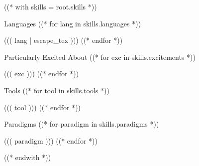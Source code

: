 ((* with skills = root.skills *))
\relax
    \vspace{-2em} %
    \begin{multicols}{2}
        \begin{csitemize}{Languages}
        ((* for lang in skills.languages *))
            \item ((( lang | escape_tex )))
        ((* endfor *))
        \end{csitemize}

        \begin{csitemize}{Particularly Excited About}
        ((* for exc in skills.excitements *))
            \item ((( exc )))
        ((* endfor *))
        \end{csitemize}

        \begin{csitemize}{Tools}
        ((* for tool in skills.tools *))
            \item ((( tool )))
        ((* endfor *))
        \end{csitemize}

        \begin{csitemize}{Paradigms}
        ((* for paradigm in skills.paradigms *))
            \item ((( paradigm )))
        ((* endfor *))
        \end{csitemize}
    \end{multicols}
((* endwith *))
